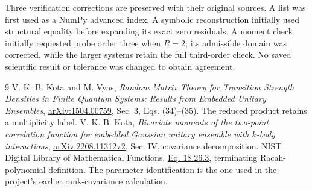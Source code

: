 \documentclass[11pt,a4paper]{article}
\begin{document}
Three verification corrections are preserved with their original
sources. A list was first used as a NumPy advanced index. A symbolic
reconstruction initially used structural equality before expanding
its exact zero residuals. A moment check initially requested probe
order three when $R=2$; its admissible domain was corrected, while
the larger systems retain the full third-order check. No saved
scientific result or tolerance was changed to obtain agreement.

\begin{thebibliography}{9}
 V. K. B. Kota and M. Vyas,
\emph{Random Matrix Theory for Transition Strength Densities in Finite
Quantum Systems: Results from Embedded Unitary Ensembles},
\href{https://arxiv.org/pdf/1504.00759}{arXiv:1504.00759},
Sec. 3, Eqs. (34)--(35). The reduced product retains a multiplicity label.
 V. K. B. Kota,
\emph{Bivariate moments of the two-point correlation function for embedded
Gaussian unitary ensemble with $k$-body interactions},
\href{https://arxiv.org/html/2208.11312}{arXiv:2208.11312v2},
Sec. IV, covariance decomposition.
 NIST Digital Library of Mathematical Functions,
\href{https://dlmf.nist.gov/18.26.E3}{Eq. 18.26.3},
terminating Racah-polynomial definition. The parameter identification
is the one used in the project's earlier rank-covariance calculation.
\end{thebibliography}
\end{document}

